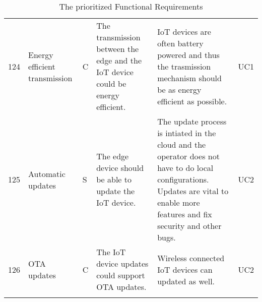 \begin{longtable}{l p{2cm} p{0.8cm} p{3.6cm} p{4.5cm} p{0.8cm} }
124                     & Energy efficient transmission           & C     & The transmission between the edge and the IoT device could be energy efficient.                                                                                  & IoT devices are often battery powered and thus the trasmission mechanism should be as energy efficient as possible.                                                               & UC1    \\
125                     & Automatic updates                       & S     & The edge device should be able to update the IoT device.                                                                                                         & The update process is intiated in the cloud and the operator does not have to do local configurations. Updates are vital to enable more features and fix security and other bugs. & UC2    \\
126                     & OTA updates                             & C     & The IoT device updates could support OTA updates.                                                                                                                & Wireless connected IoT devices can updated as well.                                                                                                                               & UC2   

\\

\caption{The prioritized Functional Requirements}
\end{longtable}
\label{tab:functionalRequirements}
\clearpage